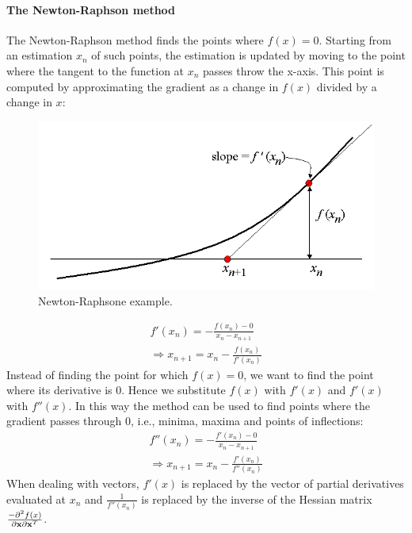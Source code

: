 \paragraph{The Newton-Raphson method}
\label{NewtonsMethod}
The Newton-Raphson method finds the points where $f(x)=0$. Starting from an estimation $x_n$ of such points, the estimation is updated by moving to the point where the tangent to the function at $x_n$ passes throw the x-axis. This point is computed by approximating the gradient as a change in $f(x)$ divided by a change in $x$:

\begin{figure}
\centering
\includegraphics[scale=0.3]{img/NewtonRaphson}
\caption{Newton-Raphsone example.}
\end{figure}

\begin{equation}
\begin{aligned}
f'(x_n) = -\frac{f(x_n)-0}{x_n -x_{n+1}}\\
\Rightarrow x_{n+1} = x_n -\frac{f(x_n)}{f'(x_n)}
\end{aligned}
\end{equation}
Instead of finding the point for which $f(x)=0$, we want to find the point where its derivative is $0$. Hence we substitute $f(x)$ with $f'(x)$ and $f'(x)$ with $f''(x)$. In this way the method can be used to find points where the gradient passes through $0$, i.e., minima, maxima and points of inflections:
\begin{equation}
\begin{aligned}
f''(x_n) = -\frac{f'(x_n)-0}{x_n -x_{n+1}}\\
\Rightarrow x_{n+1} = x_n -\frac{f'(x_n)}{f''(x_n)}
\end{aligned}
\end{equation}
When dealing with vectors, $f'(x)$ is replaced by the vector of partial derivatives evaluated at $x_n$ and $\frac{1}{f''(x_n)}$ is replaced by the inverse of the Hessian matrix $\frac{-\partial^2 f(x)}{\partial \mathbf{x} \partial \mathbf{x}^T}$.

